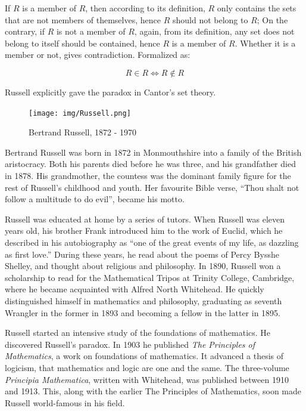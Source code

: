 \documentclass{article}
\begin{document}
If $R$ is a member of $R$, then according to its definition, $R$ only contains the sets that are not members of themselves, hence $R$ should not belong to $R$; On the contrary, if $R$ is not a member of $R$, again, from its definition, any set does not belong to itself should be contained, hence $R$ is a member of $R$. Whether it is a member or not, gives contradiction. Formalized as:

\[
R \in R \iff R \notin R
\]

Russell explicitly gave the paradox in Cantor's set theory.

\vspace{5mm}

\begin{figure}
 \centering
 \texttt{[image: img/Russell.png]}
 \captionsetup{labelformat=empty}
 \caption{Bertrand Russell, 1872 - 1970}
 \label{fig:Russell}
\end{figure}

Bertrand Russell was born in 1872 in Monmouthshire into a family of the British aristocracy. Both his parents died before he was three, and his grandfather died in 1878. His grandmother, the countess was the dominant family figure for the rest of Russell's childhood and youth. Her favourite Bible verse, ``Thou shalt not follow a multitude to do evil'', became his motto.

Russell was educated at home by a series of tutors. When Russell was eleven years old, his brother Frank introduced him to the work of Euclid, which he described in his autobiography as ``one of the great events of my life, as dazzling as first love.'' During these years, he read about the poems of Percy Bysshe Shelley, and thought about religious and philosophy. In 1890, Russell won a scholarship to read for the Mathematical Tripos at Trinity College, Cambridge, where he became acquainted with Alfred North Whitehead. He quickly distinguished himself in mathematics and philosophy, graduating as seventh Wrangler in the former in 1893 and becoming a fellow in the latter in 1895.

Russell started an intensive study of the foundations of mathematics. He discovered Russell's paradox. In 1903 he published {\em The Principles of Mathematics}, a work on foundations of mathematics. It advanced a thesis of logicism, that mathematics and logic are one and the same. The three-volume {\em Principia Mathematica}, written with Whitehead, was published between 1910 and 1913. This, along with the earlier The Principles of Mathematics, soon made Russell world-famous in his field.
\end{document}
